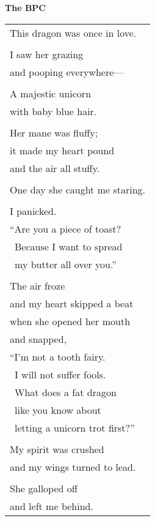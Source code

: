 \documentclass{article}
\begin{document}
\newcommand{\h}{\hspace*{2ex}}
\newcommand{\HHHH}{\hspace*{32ex}}

\begin{center}
\large\textbf{The BPC}\hspace*{15ex}
\end{center}
\begin{center}
\begin{tabular}{l}
\\
This dragon was once in love. \\
\\
I saw her grazing \\
\h and pooping everywhere--- \\
\\
A majestic unicorn \\
\h with baby blue hair. \\
\\
Her mane was fluffy; \\
\h it made my heart pound \\
\h and the air all stuffy. \\
\\
One day she caught me staring. \\
\\
I panicked. \\
\h ``Are you a piece of toast? \\
\h\ Because I want to spread \\
\h\ my butter all over you.'' \\
\\
The air froze \\
\h and my heart skipped a beat \\
\h when she opened her mouth \\
\h and snapped, \\
\h ``I'm not a tooth fairy. \\
\h\ I will not suffer fools. \\
\h\ What does a fat dragon \\
\h\ like you know about \\
\h\ letting a unicorn trot first?'' \\
\\
My spirit was crushed \\
\h and my wings turned to lead. \\
\\
She galloped off \\
\h and left me behind. \\

\end{tabular}
\end{center}
\end{document}
